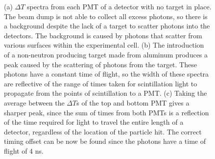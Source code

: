 \begin{figure}[htbp]
\begin{center}
\end{center}

\caption{(a) $\Delta T$ spectra from each PMT of a detector with no target in place.
The beam dump is not able to collect all excess photons, so there is a background despite the lack of a target to scatter photons into the detectors.
The background is caused by photons that scatter from various surfaces within the experimental cell.
(b) The introduction of a non-neutron producing target made from aluminum produces a peak caused by the scattering of photons from the target.
These photons have a constant time of flight, so the width of these spectra are reflective of the range of times taken for scintillation light to propagate from the points of scintillation to a PMT.
(c) Taking the average between the $\Delta T$s of the top and bottom PMT gives a sharper peak, since the sum of times from both PMTs is a reflection of the time required for light to travel the entire length of a detector, regardless of the location of the particle hit.
The correct timing offset can be now be found since the photons have a time of flight of 4 ns. }
\label{fig:ToFDetermination}
\end{figure}
   
